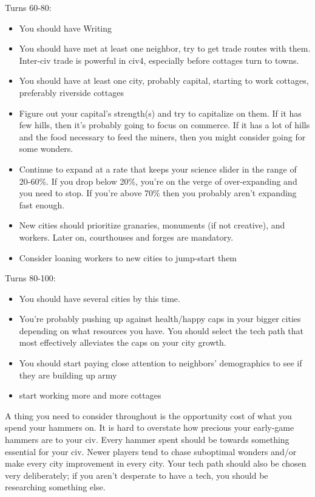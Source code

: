 \documentclass[10pt]{article}
\begin{document}
Turns 60-80:
\begin{itemize}
\item You should have Writing
\item You should have met at least one neighbor, try to get trade routes with them. Inter-civ trade is powerful in civ4, especially
  before cottages turn to towns.
\item You should have at least one city, probably capital, starting to work cottages, preferably riverside cottages
\item Figure out your capital's strength(s) and try to capitalize on them. If it has few hills, then it's probably
  going to focus on commerce. If it has a lot of hills and the food necessary to feed the miners, then you might
  consider going for some wonders.
\item Continue to expand at a rate that keeps your science slider in the range of 20-60\%. If you drop below 20\%,
  you're on the verge of over-expanding and you need to stop. If you're above 70\% then you probably aren't
  expanding fast enough.
\item New cities should prioritize granaries, monuments (if not creative), and workers. Later on, courthouses and forges are mandatory.
\item Consider loaning workers to new cities to jump-start them
\end{itemize}

Turns 80-100:
\begin{itemize}
\item You should have several cities by this time.
\item You're probably pushing up against health/happy caps in your bigger cities depending on what
  resources you have. You should select the tech path that most effectively alleviates the caps
  on your city growth.
\item You should start paying close attention to neighbors' demographics to see if they are building up army
\item start working more and more cottages
\end{itemize}

A thing you need to consider throughout is the opportunity cost of
what you spend your hammers on. It is hard to overstate how precious
your early-game hammers are to your civ. Every hammer spent should be
towards something essential for your civ. Newer players tend to chase
suboptimal wonders and/or make every city improvement in every
city. Your tech path should also be chosen very deliberately; if you
aren't desperate to have a tech, you should be researching something
else.
\end{document}
